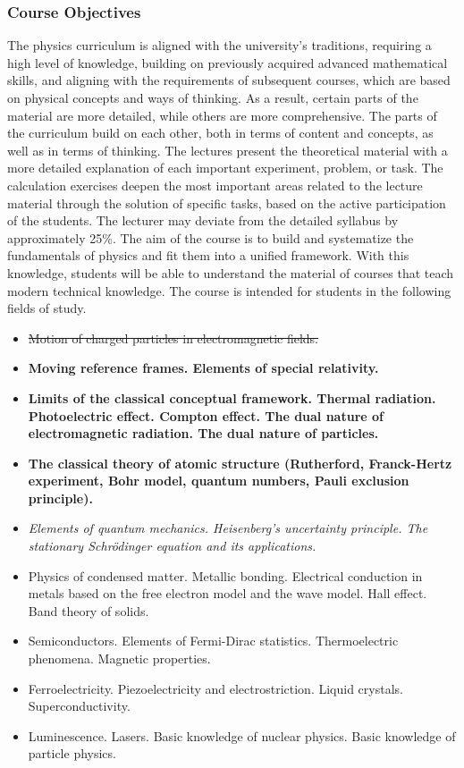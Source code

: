 \documentclass[t,aspectratio=169]{beamer}
\begin{document}
\begin{frame}
\frametitle{Course Objectives}
\small The physics curriculum is aligned with the university's traditions, requiring a high level of knowledge, building on previously acquired advanced mathematical skills, and aligning with the requirements of subsequent courses, which are based on physical concepts and ways of thinking. As a result, certain parts of the material are more detailed, while others are more comprehensive. The parts of the curriculum build on each other, both in terms of content and concepts, as well as in terms of thinking. The lectures present the theoretical material with a more detailed explanation of each important experiment, problem, or task. The calculation exercises deepen the most important areas related to the lecture material through the solution of specific tasks, based on the active participation of the students. The lecturer may deviate from the detailed syllabus by approximately 25\%. The aim of the course is to build and systematize the fundamentals of physics and fit them into a unified framework. With this knowledge, students will be able to understand the material of courses that teach modern technical knowledge. The course is intended for students in the following fields of study.
\pagebreak
\normalsize
\begin{itemize}
\setlength{\parskip}{0pt}
\setlength{\itemsep}{0pt}
\item \st{Motion of charged particles in electromagnetic fields.}
\item \textbf{Moving reference frames. Elements of special relativity.}
\item \textbf{Limits of the classical conceptual framework. Thermal radiation. Photoelectric effect. Compton effect. The dual nature of electromagnetic radiation. The dual nature of particles.}
\item \textbf{The classical theory of atomic structure (Rutherford, Franck-Hertz experiment, Bohr model, quantum numbers, Pauli exclusion principle).}
\item \textit{Elements of quantum mechanics. Heisenberg's uncertainty principle. The stationary Schrödinger equation and its applications.}
\item Physics of condensed matter. Metallic bonding. Electrical conduction in metals based on the free electron model and the wave model. Hall effect. Band theory of solids.
\pagebreak
\item Semiconductors. Elements of Fermi-Dirac statistics. Thermoelectric phenomena. Magnetic properties.  
\item Ferroelectricity. Piezoelectricity and electrostriction. Liquid crystals. Superconductivity.
\item Luminescence. Lasers. Basic knowledge of nuclear physics. Basic knowledge of particle physics.
\end{itemize}
\end{frame}
\end{document}
